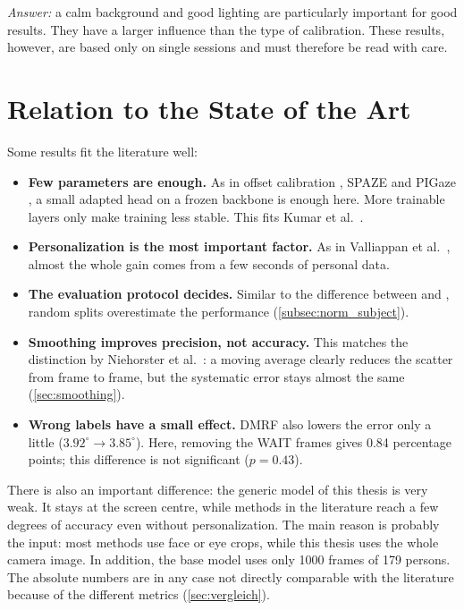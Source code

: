 \emph{Answer:} a calm background and good lighting are particularly important
for good results. They have a larger influence than the type of calibration.
These results, however, are based only on single sessions and must therefore be
read with care.

\section{Relation to the State of the Art}
\label{sec:einordnung}
Some results fit the literature well:
\begin{itemize}
  \item \textbf{Few parameters are enough.} As in offset calibration
        \cite{chen2020offset}, SPAZE \cite{linden2019spaze} and PIGaze
        \cite{wang2026pigaze}, a small adapted head on a frozen backbone is
        enough here. More trainable layers only make training less stable. This
        fits Kumar et al.~\cite{kumar2022finetuning}.
  \item \textbf{Personalization is the most important factor.} As in Valliappan
        et al.~\cite{valliappan2020smartphone}, almost the whole gain comes from
        a few seconds of personal data.
  \item \textbf{The evaluation protocol decides.} Similar to the difference
        between  and , random splits
        overestimate the performance (\cref{subsec:norm_subject}).
  \item \textbf{Smoothing improves precision, not accuracy.} This matches the
        distinction by Niehorster et al.~\cite{niehorster2026quality}: a moving
        average clearly reduces the scatter from frame to frame, but the
        systematic error stays almost the same (\cref{sec:smoothing}).
  \item \textbf{Wrong labels have a small effect.} DMRF \cite{jiang2026dmrf} also
        lowers the error only a little ($3.92^\circ \rightarrow 3.85^\circ$).
        Here, removing the WAIT frames gives \num{0.84} percentage points;
        this difference is not significant ($p=0.43$).
\end{itemize}
There is also an important difference: the generic model of this thesis is very
weak. It stays at the screen centre, while methods in the literature reach a few
degrees of accuracy even without personalization. The main reason is probably the
input: most methods use face or eye crops, while this thesis uses the whole
camera image. In addition, the base model uses only \num{1000} frames of 179
persons. The absolute numbers are in any case not directly comparable with the
literature because of the different metrics (\cref{sec:vergleich}).

